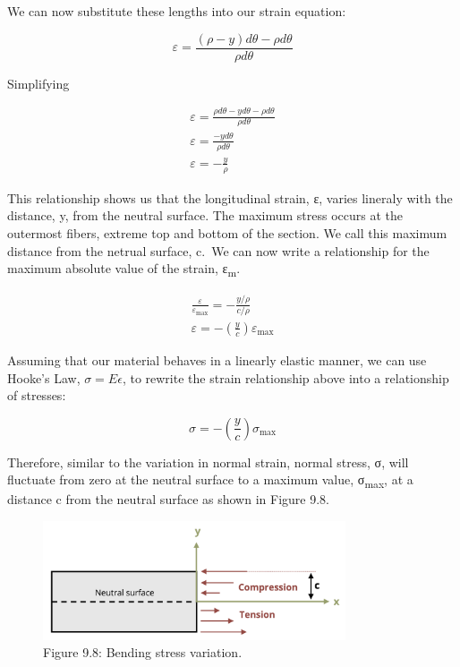\documentclass[
  letterpaper,
  DIV=11,
  numbers=noendperiod]{scrreprt}
\theoremstyle{definition}
\theoremstyle{remark}
\begin{document}
We can now substitute these lengths into our strain equation:

\[
\varepsilon=\frac{(\rho-y) d \theta-\rho d \theta}{\rho d \theta}
\]

Simplifying

\[
\begin{gathered}
\varepsilon=\frac{\rho d \theta-y d \theta-\rho d \theta}{\rho d \theta} \\
\varepsilon=\frac{-y d \theta}{\rho d \theta} \\
\varepsilon=-\frac{y}{\rho}
\end{gathered}
\]

This relationship shows us that the longitudinal strain, ε, varies
lineraly with the distance, y, from the neutral surface. The maximum
stress occurs at the outermost fibers, extreme top and bottom of the
section. We call this maximum distance from the netrual surface, c.~We
can now write a relationship for the maximum absolute value of the
strain, ε\textsubscript{m}.

\[
\begin{gathered}
\frac{\varepsilon}{\varepsilon_{\max }}=-\frac{y / \rho}{c / \rho} \\
\varepsilon=-\left(\frac{y}{c}\right) \varepsilon_{\max }
\end{gathered}
\]

Assuming that our material behaves in a linearly elastic manner, we can
use Hooke's Law, \(\sigma = E \epsilon\), to rewrite the strain
relationship above into a relationship of stresses:

\[
\sigma=-\left(\frac{y}{c}\right) \sigma_{\max }
\]

Therefore, similar to the variation in normal strain, normal stress, σ,
will fluctuate from zero at the neutral surface to a maximum value,
σ\textsubscript{max}, at a distance c from the neutral surface as shown
in Figure 9.8.

\begin{figure}[H]

{\centering \includegraphics[width=3.52083in,height=\textheight]{images/CH9 PNGs/Figure 9.8.png}

}

\caption{Figure 9.8: Bending stress variation.}

\end{figure}%
\end{document}
